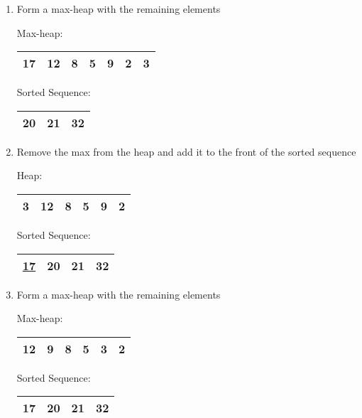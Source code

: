\documentclass[fleqn, 12pt]{article}
\begin{document}
\begin{enumerate}[Step 1:]
\item Form a max-heap with the remaining elements
    \begin{center}
        Max-heap:
        \begin{tabular}{|*{7}{c|}}
            \hline
            17 & 12 & 8 & 5 & 9 & 2 & 3\\
            \hline
        \end{tabular}
    \end{center}
    \begin{center}
        Sorted Sequence:
        \begin{tabular}{|*{3}{c|}}
            \hline
            20 & 21 & 32\\
            \hline
        \end{tabular}
    \end{center}
    
\item Remove the max from the heap and add it to the front of the sorted sequence
    \begin{center}
        Heap:
        \begin{tabular}{|*{6}{c|}}
            \hline
            3 & 12 & 8 & 5 & 9 & 2\\
            \hline
        \end{tabular}
    \end{center}
    \begin{center}
        Sorted Sequence:
        \begin{tabular}{|*{4}{c|}}
            \hline
            \underline{17} & 20 & 21 & 32\\
            \hline
        \end{tabular}
    \end{center}
    
\item Form a max-heap with the remaining elements
    \begin{center}
        Max-heap:
        \begin{tabular}{|*{6}{c|}}
            \hline
            12 & 9 & 8 & 5 & 3 & 2\\
            \hline
        \end{tabular}
    \end{center}
    \begin{center}
        Sorted Sequence:
        \begin{tabular}{|*{4}{c|}}
            \hline
            17 & 20 & 21 & 32\\
            \hline
        \end{tabular}
    \end{center}
    \newpage
   

\end{enumerate}
\end{document}

